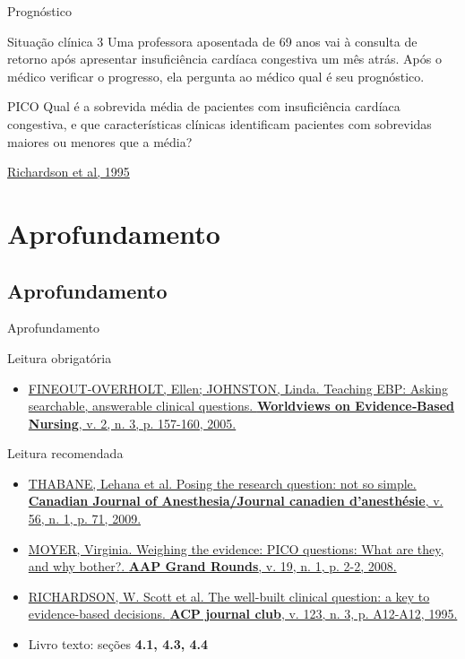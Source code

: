 \documentclass{beamer}
\begin{document}
\begin{frame}{Prognóstico}
  \begin{exampleblock}{Situação clínica 3}
    \scriptsize
    Uma professora aposentada de 69 anos vai à consulta de retorno após apresentar insuficiência cardíaca congestiva um mês atrás.
    Após o médico verificar o progresso, ela pergunta ao médico qual é seu prognóstico.
  \end{exampleblock}
  \begin{exampleblock}{PICO}
    Qual é a sobrevida média de pacientes com insuficiência cardíaca congestiva, e que características clínicas identificam pacientes com sobrevidas maiores ou menores que a média?
  \end{exampleblock}
  \vfill
  \scriptsize
  \hfill \href{https://acpjc.acponline.org/Content/123/3/issue/ACPJC-1995-123-3-A12.htm}
  {Richardson et al, 1995}
\end{frame}

\section{Aprofundamento}

\subsection{Aprofundamento}

\begin{frame}{Aprofundamento}
  \begin{block}{Leitura obrigatória}
    \begin{itemize}
      \scriptsize
    \item \href{https://doi.org/10.1111/j.1741-6787.2005.00032.x}
      {FINEOUT‐OVERHOLT, Ellen; JOHNSTON, Linda. Teaching EBP: Asking
        searchable, answerable clinical questions. {\bf Worldviews on
          Evidence‐Based Nursing}, v. 2, n. 3, p. 157-160, 2005.}
    \end{itemize}
  \end{block}
  \begin{block}{Leitura recomendada}
    \begin{itemize}
      \tiny
    \item \href{https://doi.org/10.1007/s12630-008-9007-4}
      {THABANE, Lehana et al. Posing the research question: not so
        simple. {\bf Canadian Journal of Anesthesia/Journal canadien
          d'anesthésie}, v. 56, n. 1, p. 71, 2009.}
    \item \href{https://doi.org/10.1542/gr.19-1-2}
      {MOYER, Virginia. Weighing the evidence: PICO questions: What
        are they, and why bother?. {\bf AAP Grand Rounds}, v. 19,
        n. 1, p. 2-2, 2008.}
    \item
      \href{https://acpjc.acponline.org/Content/123/3/issue/ACPJC-1995-123-3-A12.htm}
      {RICHARDSON, W. Scott et al. The well-built clinical question: a
        key to evidence-based decisions. {\bf ACP journal club},
        v. 123, n. 3, p. A12-A12, 1995.}
      \scriptsize
    \item Livro texto: seções {\bf 4.1, 4.3, 4.4}
    \end{itemize}
  \end{block}
\end{frame}
\end{document}
